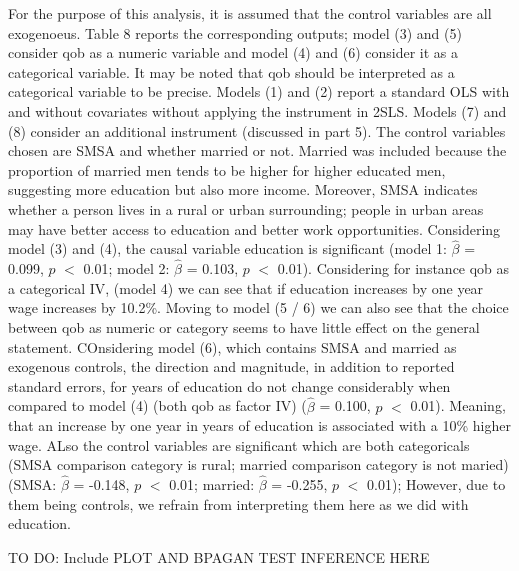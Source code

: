 \documentclass[a4paper]{article}
\begin{document}
For the purpose of this analysis, it is assumed that the control variables are all exogenoeus. Table 8 reports the corresponding outputs; model (3) and (5) consider qob as a numeric variable and model (4) and (6) consider it as a categorical variable. It may be noted that qob should be interpreted as a categorical variable to be precise. Models (1) and (2) report a standard OLS with and without covariates without applying the instrument in 2SLS. Models (7) and (8) consider an additional instrument (discussed in part 5).
The control variables chosen are SMSA and whether married or not. Married was included because the proportion of married men tends to be higher for higher educated men, suggesting more education but also more income. Moreover, SMSA indicates whether a person lives in a rural or urban surrounding; people in urban areas may have better access to education and better work opportunities.
Considering model (3) and (4), the causal variable education is significant (model 1: $\hat{\beta}$ = 0.099, $p$ $<$ 0.01; model 2: $\hat{\beta}$ = 0.103, $p$ $<$ 0.01). Considering for instance qob as a categorical IV, (model 4) we can see that if education increases by one year wage increases by 10.2\%. Moving to model (5 / 6) we can also see that the choice between qob as numeric or category seems to have little effect on the general statement.
COnsidering model (6), which contains SMSA and married as exogenous controls, the direction and magnitude, in addition to reported standard errors, for years of education do not change considerably when compared to model (4) (both qob as factor IV) ($\hat{\beta}$ = 0.100, $p$ $<$ 0.01). Meaning, that an increase by one year in years of education is associated with a 10\% higher wage. ALso the control variables are significant which are both categoricals (SMSA comparison category is rural; married comparison category is not maried) (SMSA: $\hat{\beta}$ = -0.148, $p$ $<$ 0.01; married: $\hat{\beta}$ = -0.255, $p$ $<$ 0.01); However, due to them being controls, we refrain from interpreting them here as we did with education. 

TO DO: Include PLOT AND BPAGAN TEST INFERENCE HERE
 
\end{document}
